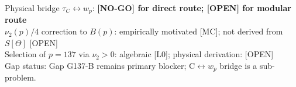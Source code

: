 \documentclass[12pt,a4paper]{article}
\begin{document}
\begin{statusbox}
Physical bridge $\tau_C \leftrightarrow w_p$: \textbf{[NO-GO] for direct route; [OPEN] for modular route}\\
$\nu_2(p)/4$ correction to $B(p)$: empirically motivated [MC]; not derived from $S[\Theta]$ [OPEN]\\
Selection of $p=137$ via $\nu_2>0$: algebraic [L0]; physical derivation: [OPEN]\\
Gap status: Gap G137-B remains primary blocker; C$\leftrightarrow w_p$ bridge is a sub-problem.
\end{statusbox}

\ifdefined\INCLUDEMODE
\else
  
\end{document}
